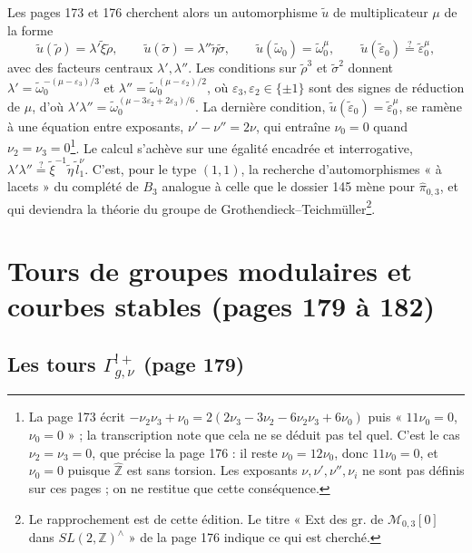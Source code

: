 \documentclass[11pt,a4paper]{article}
\begin{document}
Les pages 173 et 176 cherchent alors un automorphisme $\tilde u$ de multiplicateur
$\mu$ de la forme
\[
\tilde u(\tilde\rho) = \lambda'\tilde\xi\tilde\rho, \qquad \tilde u(\tilde\sigma) = \lambda''\tilde\eta\tilde\sigma,
\qquad \tilde u(\tilde\omega_0) = \tilde\omega_0^{\mu}, \qquad \tilde u(\tilde\varepsilon_0) \overset{?}{=} \tilde\varepsilon_0^{\mu},
\]
avec des facteurs centraux $\lambda', \lambda''$. Les conditions sur
$\tilde\rho^3$ et $\tilde\sigma^2$ donnent
$\lambda' = \tilde\omega_0^{-(\mu - \varepsilon_3)/3}$ et
$\lambda'' = \tilde\omega_0^{(\mu - \varepsilon_2)/2}$, où
$\varepsilon_3, \varepsilon_2 \in \{\pm 1\}$ sont des signes de réduction
de $\mu$, d'où $\lambda'\lambda'' = \tilde\omega_0^{(\mu - 3\varepsilon_2 + 2\varepsilon_3)/6}$.
La dernière condition, $\tilde u(\tilde\varepsilon_0) = \tilde\varepsilon_0^{\mu}$,
se ramène à une équation entre exposants, $\nu' - \nu'' = 2\nu$, qui entraîne
$\nu_0 = 0$ quand $\nu_2 = \nu_3 = 0$\footnote{La page 173 écrit
$-\nu_2\nu_3 + \nu_0 = 2(2\nu_3 - 3\nu_2 - 6\nu_2\nu_3 + 6\nu_0)$ puis
« $11\nu_0 = 0$, $\nu_0 = 0$ » ; la transcription note que cela ne se déduit pas
tel quel. C'est le cas $\nu_2 = \nu_3 = 0$, que précise la page 176 : il reste
$\nu_0 = 12\nu_0$, donc $11\nu_0 = 0$, et $\nu_0 = 0$ puisque
$\widehat{\mathbb{Z}}$ est sans torsion. Les exposants $\nu, \nu', \nu'', \nu_i$
ne sont pas définis sur ces pages ; on ne restitue que cette conséquence.}.
Le calcul s'achève sur une égalité encadrée et interrogative,
$\lambda'\lambda'' \overset{?}{=} \tilde\xi^{-1}\tilde\eta\,\tilde l_1^{\nu}$. C'est,
pour le type $(1,1)$, la recherche d'automorphismes « à lacets » du complété de
$B_3$ analogue à celle que le dossier 145 mène pour $\widehat{\pi}_{0,3}$, et qui
deviendra la théorie du groupe de Grothendieck–Teichmüller\footnote{Le
rapprochement est de cette édition. Le titre « Ext des gr. de
$\mathcal{M}_{0,3}[0]$ dans $SL(2, \mathbb{Z})^{\wedge}$ » de la page 176
indique ce qui est cherché.}.

\section*{Tours de groupes modulaires et courbes stables (pages 179 à 182)}

\subsection*{Les tours $\Gamma^{!+}_{g,\nu}$ (page 179)}
\end{document}
